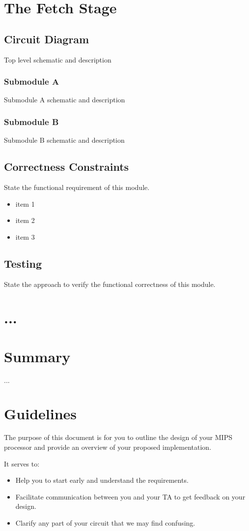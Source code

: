 \documentclass[10pt]{article}
\begin{document}
\section{The Fetch Stage}

\subsection{Circuit Diagram}
Top level schematic and description
\subsubsection{Submodule A}
Submodule A schematic and description
\subsubsection{Submodule B}
Submodule B schematic and description

\subsection{Correctness Constraints}
State the functional requirement of this module.
\begin{itemize}
\item item 1
\item item 2
\item item 3
\end{itemize}

\subsection{Testing}
State the approach to verify the functional correctness of this module.

\section{...}

\section{Summary}
...

\section{Guidelines}
The purpose of this document is for you to outline the design of your MIPS processor and provide an overview of your proposed implementation. 

It serves to:
\begin{itemize}
\item Help you to start early and understand the requirements.
\item Facilitate communication between you and your TA to get feedback on your design.
\item Clarify any part of your circuit that we may find confusing.
\end{itemize}
\end{document}
